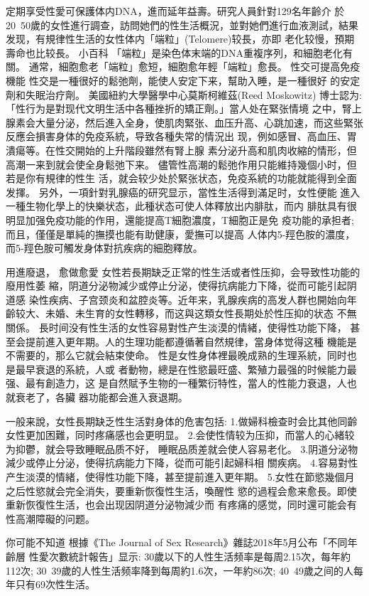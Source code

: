 \documentclass[12pt,UTF8]{ctexbook}
\begin{document}
定期享受性愛可保護体内DNA，進而延年益壽。研究人員針對129名年齡介
於20~50歲的女性進行調查，訪問她們的性生活概況，並對她們進行血液測試，結果发现，有規律性生活的女性体内「端粒」(Telomere)较長，亦即
老化较慢，預期壽命也比较長。
小百科
「端粒」是染色体末端的DNA重複序列，和細胞老化有關。
通常，細胞愈老「端粒」愈短，細胞愈年輕「端粒」愈長。
性交可提高免疫機能
性交是一種很好的鬆弛劑，能使人安定下来，幫助入睡，是一種很好
的安定劑和失眠治疗劑。
美國紐約大學醫學中心莫斯柯維茲(Reed Moskowitz) 博士認为:
「性行为是對现代文明生活中各種挫折的矯正劑。」當人处在緊张情境
之中，腎上腺素会大量分泌，然后進入全身，使肌肉緊张、血压升高、心跳加速，而这些緊张反應会損害身体的免疫系統，导致各種失常的情況出
现，例如感冒、高血压、胃潰瘍等。在性交開始的上升階段雖然有腎上腺
素分泌升高和肌肉收縮的情形，但高潮一来到就会使全身鬆弛下来。
儘管性高潮的鬆弛作用只能維持幾個小时，但若是你有規律的性生
活，就会较少处於緊张状态，免疫系統的功能就能得到全面发揮。
另外，一項針對乳腺癌的研究显示，當性生活得到滿足时，女性便能
進入一種生物化學上的快樂状态，此種状态可使人体釋放出内腓肽，而内
腓肽具有很明显加强免疫功能的作用，還能提高T細胞濃度，T細胞正是免
疫功能的承担者;而且，僅僅是單純的撫摸也能有助健康，愛撫可以提高
人体内5-羥色胺的濃度，而5-羥色胺可觸发身体對抗疾病的細胞釋放。

用進廢退，
愈做愈愛
女性若長期缺乏正常的性生活或者性压抑，会导致性功能的廢用性萎
縮，阴道分泌物減少或停止分泌，使得抗病能力下降，從而可能引起阴道感
染性疾病、子宫颈炎和盆腔炎等。近年来，乳腺疾病的高发人群也開始向年
齡较大、未婚、未生育的女性轉移，而这與这類女性長期处於性压抑的状态
不無關係。
長时间没有性生活的女性容易對性产生淡漠的情緒，使得性功能下降，
甚至会提前進入更年期。人的生理功能都遵循著自然規律，當身体觉得这種
機能是不需要的，那么它就会結束使命。
性是女性身体裡最晚成熟的生理系統，同时也是最早衰退的系統，人或
者動物，總是在性慾最旺盛、繁殖力最强的时候能力最强、最有創造力，这
是自然賦予生物的一種繁衍特性，當人的性能力衰退，人也就衰老了，各臟
器功能都会進入衰退期。

一般来說，女性長期缺乏性生活對身体的危害包括:
1.做婦科檢查时会比其他同齡女性更加困難，同时疼痛感也会更明显。
2.会使性情较为压抑，而當人的心緒较为抑鬱，就会导致睡眠品质不好，
睡眠品质差就会使人容易老化。
3.阴道分泌物減少或停止分泌，使得抗病能力下降，從而可能引起婦科相
關疾病。
4.容易對性产生淡漠的情緒，使得性功能下降，甚至提前進入更年期。
5.女性在節慾幾個月之后性慾就会完全消失，要重新恢復性生活，喚醒性
慾的過程会愈来愈長。即使重新恢復性生活，也会出现因阴道分泌物減少而
有疼痛的感觉，同时還可能会有性高潮障礙的问题。

你可能不知道
根據《The Journal of Sex Research》雜誌2018年5月公布「不同年齡層
性愛次數統計報告」显示:
30歲以下的人性生活频率是每周2.15次，每年約112次;
30~39歲的人性生活频率降到每周約1.6次，一年約86次;
40~49歲之间的人每年只有69次性生活。
\end{document}
